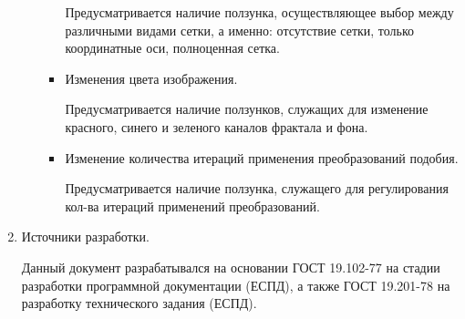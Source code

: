 \documentclass[a4paper,12pt,preview]{report} %
\begin{document}
\begin{enumerate}
\begin{enumerate}
\begin{itemize}
				Предусматривается наличие ползунка, осуществляющее выбор между различными видами сетки, а именно: отсутствие сетки, только координатные оси, полноценная сетка. \\
				
				\item Изменения цвета изображения.
				
				Предусматривается наличие ползунков, служащих для изменение красного, синего и зеленого каналов фрактала и фона. \\
				
				\item Изменение количества итераций применения преобразований подобия.
				
				Предусматривается наличие ползунка, служащего для регулирования кол-ва итераций применений преобразований.
				
				
			\end{itemize}
		
		
		\end{enumerate}
		
		\item Источники разработки.
		
		Данный документ разрабатывался на основании ГОСТ 19.102-77 на стадии разработки программной документации (ЕСПД), а также ГОСТ 19.201-78 на разработку технического задания (ЕСПД).
		
	\end{enumerate}
	
	
\end{document}
